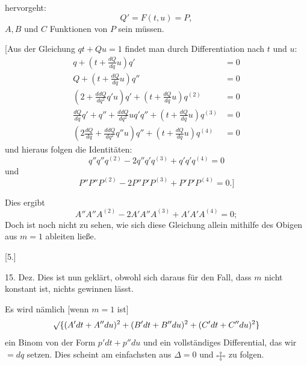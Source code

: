 %
\noindent hervorgeht:
\[
Q'=F(t,u)=P,
\]
$A,B$ und $C$ Funktionen von $P$ sein müssen.

[Aus der Gleichung $qt+Qu=1$ findet man durch Differentiation nach $t$ und $u$:
\[
\begin{aligned}
q+\left(t+\frac{dQ}{dq}u\right)q'&=0\\
Q+\left(t+\frac{dQ}{dq}u\right)q''&=0\\
\left(2+\frac{ddQ}{dq^2}q'u\right)q'+\left(t+\frac{dQ}{dq}u\right)q^{(2)}&=0\\
\frac{dQ}{dq}q'+q''+\frac{ddQ}{dq^2}u q'q''+\left(t+\frac{dQ}{dq}u\right)q^{(3)}&=0\\
\left(2\frac{dQ}{dq}+\frac{ddQ}{dq^2}q''u\right)q''+\left(t+\frac{dQ}{dq}u\right)q^{(4)}&=0
\end{aligned}
\]
und hieraus folgen die Identitäten:
\[
q''q''q^{(2)}-2q''q'q^{(3)}+q'q'q^{(4)}=0
\]
und
\[
P''P''P^{(2)}-2P''P'P^{(3)}+P'P'P^{(4)}=0.]
\]
\par\indent Dies ergibt
\[
A''A''A^{(2)}-2A'A''A^{(3)}+A'A'A^{(4)}=0;
\]
Doch ist noch nicht zu sehen, wie sich diese Gleichung allein mithilfe des Obigen aus $m=1$ ableiten ließe.
\begin{center}[5.]\end{center}
\noindent\hspace*{1.2em} 15. Dez. Dies ist nun geklärt, obwohl sich daraus für den Fall, dass $m$ nicht konstant ist, nichts gewinnen lässt.

Es wird nämlich [wenn $m=1$ ist]
\[
\mathord{\surd}\{(A'dt+A''du)^2+(B'dt+B''du)^2+(C'dt+C''du)^2\}
\]
ein Binom von der Form $p'dt+p''du$ und ein vollständiges Differential, das wir $=dq$ setzen. Dies scheint am einfachsten aus $\Delta=0$ und $\FourRingCross$ zu folgen.
